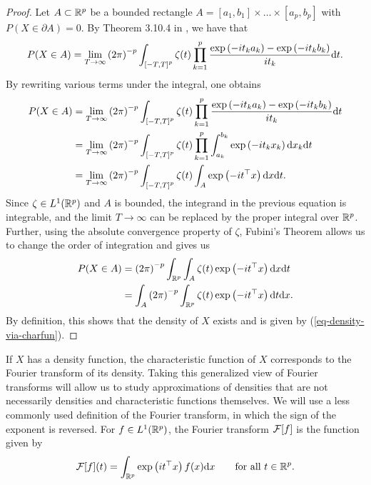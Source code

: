 \begin{proof}
    Let $A \subset \Rp$ be a bounded rectangle $A = [a_1, b_1] \times \ldots \times [a_p, b_p]$ with $P(X \in \partial A) = 0$. By Theorem 3.10.4 in \cite{durrett_2019}, we have that
    \begin{equation*}
        P(X \in A) = \lim_{T \rightarrow \infty} \left(2\pi\right)^{-p}\int_{\left[-T, T\right]^p} \zeta(t) \prod_{k=1}^p \frac{\expf{-it_k a_k} - \expf{-it_k b_k}}{i t_k} \d t.
    \end{equation*}
    By rewriting various terms under the integral, one obtains
    \begin{align*}
        P(X \in A) 
        &= \lim_{T \rightarrow \infty} \left(2\pi\right)^{-p}\int_{\left[-T, T\right]^p} \zeta(t) \prod_{k=1}^p \frac{\expf{-it_k a_k} - \expf{-it_k b_k}}{i t_k} \d t \\
        &= \lim_{T \rightarrow \infty} \left(2\pi\right)^{-p}\int_{\left[-T, T\right]^p} \zeta(t) \prod_{k=1}^p \int_{a_k}^{b_k}\expf{-i t_k x_k} \d x_k \d t \\
        &= \lim_{T \rightarrow \infty} \left(2\pi\right)^{-p}\int_{\left[-T, T\right]^p} \zeta(t) \int_A \expf{-i t^\top x} \d x \d t.
    \end{align*}
    Since $\zeta \in L^1(\Rp)$ and $A$ is bounded, the integrand in the previous equation is integrable, and the limit $T \rightarrow \infty$ can be replaced by the proper integral over $\Rp$. Further, using the absolute convergence property of $\zeta$, Fubini's Theorem allows us to change the order of integration and gives us
    \begin{align*}
        P(X \in A) 
        &= \left(2\pi\right)^{-p}\intRp{t}{\int_A \zeta(t) \expf{-i t^\top x} \d x} \\
        &= \int_A \left(2\pi\right)^{-p} \intRp{t}{\zeta(t) \expf{-i t^\top x} } \d x.
    \end{align*}
    By definition, this shows that the density of $X$ exists and is given by (\ref{eq-density-via-charfun}).
\end{proof}

If $X$ has a density function, the characteristic function of $X$ corresponds to the Fourier transform of its density. Taking this generalized view of Fourier transforms will allow us to study approximations of densities that are not necessarily densities and characteristic functions themselves. We will use a less commonly used definition of the Fourier transform, in which the sign of the exponent is reversed. For $f \in L^1(\Rp)$, the Fourier transform $\F[f]$ is the function given by
\begin{equation} \label{eq-fourier-density}
    \F[f](t) = \int_\Rp \expf{it^\top x}f(x)\d x \ \ \ \ \ \ \t{for all } t \in \Rp.
\end{equation}

